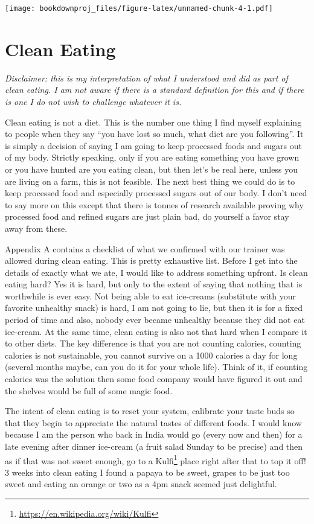 \documentclass[
  oneside]{book}
\DeclareRobustCommand{\href}[2]{#2\footnote{\url{#1}}}
\begin{document}
\texttt{[image: bookdownproj\_files/figure-latex/unnamed-chunk-4-1.pdf]}

\hypertarget{clean-eating}{%
\chapter{Clean Eating}\label{clean-eating}}

\emph{Disclaimer: this is my interpretation of what I understood and did as part of clean eating. I am not aware if there is a standard definition for this and if there is one I do not wish to challenge whatever it is.}

Clean eating is not a diet. This is the number one thing I find myself explaining to people when they say ``you have lost so much, what diet are you following''. It is simply a decision of saying I am going to keep processed foods and sugars out of my body. Strictly speaking, only if you are eating something you have grown or you have hunted are you eating clean, but then let's be real here, unless you are living on a farm, this is not feasible. The next best thing we could do is to keep processed food and especially processed sugars out of our body. I don't need to say more on this except that there is tonnes of research available proving why processed food and refined sugars are just plain bad, do yourself a favor stay away from these.

Appendix A contains a checklist of what we confirmed with our trainer was allowed during clean eating. This is pretty exhaustive list. Before I get into the details of exactly what we ate, I would like to address something upfront. Is clean eating hard? Yes it is hard, but only to the extent of saying that nothing that is worthwhile is ever easy. Not being able to eat ice-creams (substitute with your favorite unhealthy snack) is hard, I am not going to lie, but then it is for a fixed period of time and also, nobody ever became unhealthy because they did not eat ice-cream. At the same time, clean eating is also not that hard when I compare it to other diets. The key difference is that you are not counting calories, counting calories is not sustainable, you cannot survive on a 1000 calories a day for long (several months maybe, can you do it for your whole life). Think of it, if counting calories was the solution then some food company would have figured it out and the shelves would be full of some magic food.

The intent of clean eating is to reset your system, calibrate your taste buds so that they begin to appreciate the natural tastes of different foods. I would know because I am the person who back in India would go (every now and then) for a late evening after dinner ice-cream (a fruit salad Sunday to be precise) and then as if that was not sweet enough, go to a \href{https://en.wikipedia.org/wiki/Kulfi}{Kulfi} place right after that to top it off! 3 weeks into clean eating I found a papaya to be sweet, grapes to be just too sweet and eating an orange or two as a 4pm snack seemed just delightful.
\end{document}
